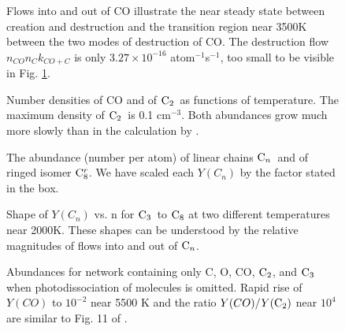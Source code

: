 \documentclass[manuscript]{aastex}
\newcommand{\ctwo}{{\rm C}_2}
\newcommand{\cthree}{{\rm C}_3}
\newcommand{\ceight}{{\rm C}_8}
\newcommand{\ceightr}{{\rm C}_8^r}
\newcommand{\cenn}{{\rm C}_n}
\begin{document}
\clearpage

\begin{figure}
\caption{
Flows into and out of CO illustrate the near steady state between creation
and destruction and the transition region near 3500K between the two modes
of destruction of CO.
The destruction flow $n_{CO} n_C k_{CO+C}$ is only $3.27 \times
10^{-16}$ atom$^{-1}$s$^{-1}$, too small to be visible in Fig. \ref{fig:flows}. 
} \label{fig:flows}
\end{figure}

\clearpage

\begin{figure}
\caption{
Number densities of CO and of $\ctwo$\ as functions of temperature.
The maximum density of $\ctwo$\ is 0.1 cm$^{-3}$.
Both abundances grow much more slowly than in the calculation by
\citet{2009ApJ...703..642C}.} \label{fig:ncoc2}
\end{figure}

\clearpage

\begin{figure}
\caption{
The abundance (number per atom) of linear chains $\cenn$\ and of ringed isomer
$\ceightr$. We have scaled each $Y(C_n)$ by the factor stated in the box.}
\label{fig:yi}
\end{figure}

\clearpage

\begin{figure}
\caption{
Shape of $Y(C_n)$ vs. n for $\cthree$\ to $\ceight$
at two different temperatures
near 2000K. These shapes can be understood by the relative magnitudes of
flows into and out of $\cenn$.
}
\label{fig:cn}
\end{figure}

\clearpage

\begin{figure}
\caption{
Abundances for network containing only C, O, CO, $\ctwo$, and $\cthree$
when photodissociation of molecules is omitted. Rapid rise of $Y(CO)$
to $10^{-2}$ near 5500 K and the ratio $Y(CO)/Y(\ctwo)$ near $10^4$ are
similar to Fig. 11 of \citet{2009ApJ...703..642C}.
}
\label{fig:no_gamma}
\end{figure}

\clearpage
\end{document}
